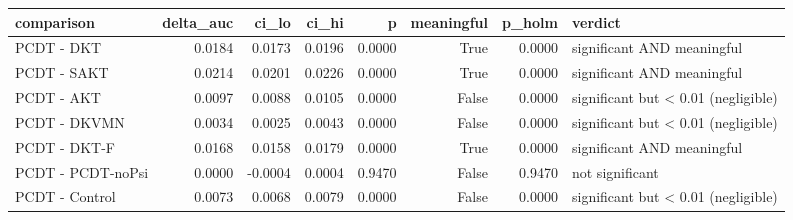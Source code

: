 \begin{tabular}{lrrrrrrl}
\toprule
comparison & delta\_auc & ci\_lo & ci\_hi & p & meaningful & p\_holm & verdict \\
\midrule
PCDT - DKT & 0.0184 & 0.0173 & 0.0196 & 0.0000 & True & 0.0000 & significant AND meaningful \\
PCDT - SAKT & 0.0214 & 0.0201 & 0.0226 & 0.0000 & True & 0.0000 & significant AND meaningful \\
PCDT - AKT & 0.0097 & 0.0088 & 0.0105 & 0.0000 & False & 0.0000 & significant but < 0.01 (negligible) \\
PCDT - DKVMN & 0.0034 & 0.0025 & 0.0043 & 0.0000 & False & 0.0000 & significant but < 0.01 (negligible) \\
PCDT - DKT-F & 0.0168 & 0.0158 & 0.0179 & 0.0000 & True & 0.0000 & significant AND meaningful \\
PCDT - PCDT-noPsi & 0.0000 & -0.0004 & 0.0004 & 0.9470 & False & 0.9470 & not significant \\
PCDT - Control & 0.0073 & 0.0068 & 0.0079 & 0.0000 & False & 0.0000 & significant but < 0.01 (negligible) \\
\bottomrule
\end{tabular}
